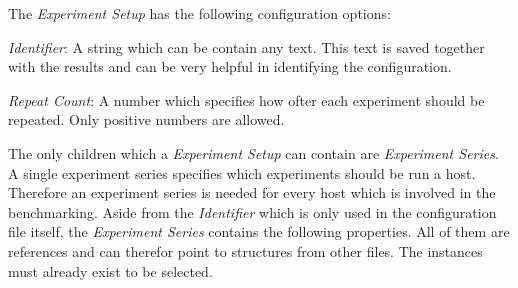 The \textit{Experiment Setup} has the following configuration options:
\begin{itemize*}
        \item \textit{Identifier}: A string which can be contain any text. This
            text is saved together with the results and can be very helpful in
            identifying the configuration.
        \item \textit{Repeat Count}: A number which specifies how ofter each
            experiment should be repeated. Only positive numbers are allowed.

\end{itemize*}

The only children which a \textit{Experiment Setup} can contain are
\textit{Experiment Series}. A single experiment series specifies which
experiments should be run a host. Therefore an experiment series is needed for
every host which is involved in the benchmarking. Aside from the
\textit{Identifier} which is only used in the configuration file itself, the
\textit{Experiment Series} contains the following properties. All of them are
references and can therefor point to structures from other files. The instances
must already exist to be selected.
